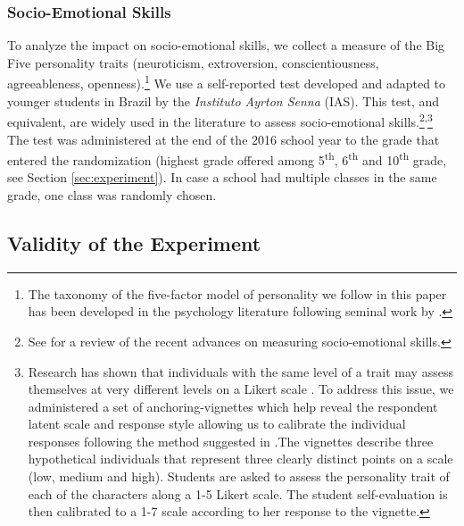 \documentclass[11pt,a4paper]{article}
\begin{document}
	\subsubsection*{Socio-Emotional Skills} 
	To analyze the impact on socio-emotional skills, we collect a measure of the Big Five personality traits (neuroticism, extroversion, conscientiousness, agreeableness, openness).\footnote{The taxonomy of the five-factor model of personality we follow in this paper has been developed in the psychology literature following seminal work by \citet{fiske1949consistency}.} We use a self-reported test developed and adapted to younger students in Brazil by the \textit{Instituto Ayrton Senna} (IAS). This test, and equivalent, are widely used in the literature to assess socio-emotional skills.\footnote{See \cite{kautz2014fostering} for a review of the recent advances on measuring socio-emotional skills.}\textsuperscript{,}\footnote{Research has shown that individuals with the same level of a trait may assess themselves at very different levels on a Likert scale \citep{primi2016anchor}. To address this issue, we administered a set of anchoring-vignettes which help reveal the respondent latent scale and response style allowing us to calibrate the individual responses following the method suggested in \cite{primi2016anchor}.The vignettes describe three hypothetical individuals that represent three clearly distinct points on a scale (low, medium and high). Students are asked to assess the personality trait of each of the characters along a 1-5 Likert scale. The student self-evaluation is then calibrated to a 1-7 scale according to her response to the vignette.} The test was administered at the end of the 2016 school year to the grade that entered the randomization (highest grade offered among 5\textsuperscript{th}, 6\textsuperscript{th} and 10\textsuperscript{th} grade, see Section \ref{sec:experiment}). In case a school had multiple classes in the same grade, one class was randomly chosen.  
	
	
	\subsection{Validity of the Experiment} \label{sec:balance}
	
\end{document}
